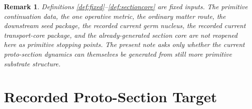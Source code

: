 \documentclass[11pt]{article}
\newtheorem{remark}{Remark}
\begin{document}
\begin{remark}
Definitions \ref{def:fixed}--\ref{def:sectioncore} are fixed inputs. The primitive continuation data, the one operative metric, the ordinary matter route, the downstream seed package, the recorded current germ nucleus, the recorded current transport-core package, and the already-generated section core are not reopened here as primitive stopping points. The present note asks only whether the current proto-section dynamics can themselves be generated from still more primitive substrate structure.
\end{remark}

\section{Recorded Proto-Section Target}
\end{document}
